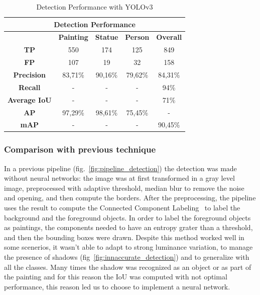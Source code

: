 \begin{table}[ht!]
    \centering
\begin{tabular}{|c|c|c|c|c|}
\hline
\multicolumn{5}{|c|}{\textbf{Detection Performance}}       \\ \hline
\multicolumn{1}{|l|}{} & \textbf{Painting} & \textbf{Statue} & \textbf{Person} & \textbf{Overall} \\ \hline
\textbf{TP}        & 550     & 174     & 125     & 849     \\ \hline
\textbf{FP}        & 107     & 19      & 32      & 158     \\ \hline
\textbf{Precision} & 83,71\% & 90,16\% & 79,62\% & 84,31\% \\ \hline
\textbf{Recall}    & -       & -       & -       & 94\%    \\ \hline
\textbf{Average IoU}       & -       & -       & -       & 71\%    \\ \hline
\textbf{AP}        & 97,29\% & 98,61\% & 75,45\% & -       \\ \hline
\textbf{mAP}       & -       & -       & -       & 90,45\% \\ \hline
\end{tabular}
\caption{Detection Performance with YOLOv3}
    \label{tab:detection_performance}
\end{table}



\subsubsection{Comparison with previous technique}
In a previous pipeline (fig.~\ref{fig:pipeline_detection}) the detection was made without neural networks: the image was at first transformed in a gray level image, preprocessed with adaptive threshold, median blur \cite{median-blur} to remove the noise and opening, and then compute the borders.
After the preprocessing, the pipeline uses the result to compute the  Connected Component Labeling~\cite{Grana_ccl} to label the background and the foreground objects.
In order to label the foreground objects as paintings, the components needed to have an entropy grater than a threshold, and then the bounding boxes were drawn.
Despite this method worked well in some scenerios, it wasn't able to adapt to strong luminance variation, to manage the presence of shadows (fig~\ref{fig:innaccurate_detection}) and to generalize with all the classes. Many times the shadow was recognized as an object or as part of the painting and for this reason the IoU was computed with not optimal performance, this reason led us to choose to implement a neural network.

